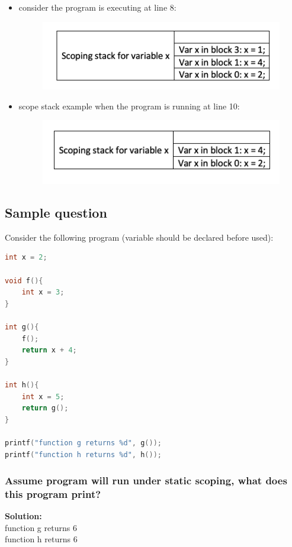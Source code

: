 \documentclass[11pt]{article}
\begin{document}
\begin{itemize}
\item consider the program is executing at line 8:
\begin{figure}[hbt!]
  \includegraphics[scale = 0.5]{lin8.png}
  \label{fig:correct}
\end{figure}
\item scope stack example when the program is running at line 10:
\begin{figure}[hbt!]
  \includegraphics[scale = 0.5]{lin10.png}
  \label{fig:correct}
\end{figure}
\end{itemize}

\subsection{Sample question}
Consider the following program (variable should be declared before used):
\begin{lstlisting}[mathescape, language=c++]
int x = 2;

void f(){
    int x = 3;
}

int g(){
    f();
    return x + 4;
}

int h(){
    int x = 5;
    return g();
}

printf("function g returns %d", g());
printf("function h returns %d", h());
\end{lstlisting}
\subsubsection{Assume program will run under static scoping, what does this program print?}
\textbf{Solution:} \\
function g returns 6\\
function h returns 6
\end{document}
